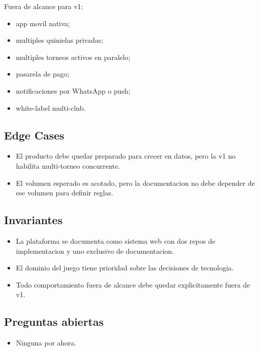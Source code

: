 Fuera de alcance para v1:

\begin{itemize}
  \item app movil nativa;
  \item multiples quinielas privadas;
  \item multiples torneos activos en paralelo;
  \item pasarela de pago;
  \item notificaciones por WhatsApp o push;
  \item white-label multi-club.
\end{itemize}

\subsection{Edge Cases}

\begin{itemize}
  \item El producto debe quedar preparado para crecer en datos, pero la v1 no habilita multi-torneo concurrente.
  \item El volumen esperado es acotado, pero la documentacion no debe depender de ese volumen para definir reglas.
\end{itemize}

\subsection{Invariantes}

\begin{itemize}
  \item La plataforma se documenta como sistema web con dos repos de implementacion y uno exclusivo de documentacion.
  \item El dominio del juego tiene prioridad sobre las decisiones de tecnologia.
  \item Todo comportamiento fuera de alcance debe quedar explicitamente fuera de v1.
\end{itemize}

\subsection{Preguntas abiertas}

\begin{itemize}
  \item Ninguna por ahora.
\end{itemize}
